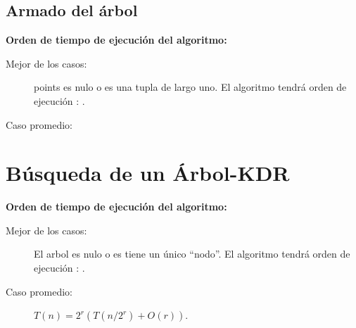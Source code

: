 \subsection{Armado del árbol}



\textbf{Orden de tiempo de ejecución del algoritmo:}
\begin{description}
\item[Mejor de los casos:] points es nulo o es una tupla de largo uno.
  El algoritmo tendrá orden de ejecución : .
\item[Caso promedio:] 
\end{description}



\section{Búsqueda de un Árbol-KDR}



\textbf{Orden de tiempo de ejecución del algoritmo:}
\begin{description}
\item[Mejor de los casos:] El arbol es nulo o es tiene un único ``nodo''.
  El algoritmo tendrá orden de ejecución : .
\item[Caso promedio:] \(T(n)= 2^r (T(n/2^r)+ O(r))\).
\end{description}


